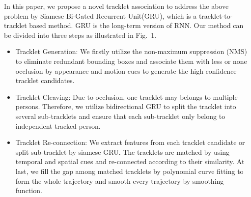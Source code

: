 \documentclass[5pt]{article}
\begin{document}
In this paper, we propose a novel tracklet association to address the above problem by Siamese Bi-Gated Recurrent Unit(GRU), which is a tracklet-to-tracklet based method. GRU is the long-term version of RNN. Our method can be divided into three steps as illustrated in Fig.\ 1.

\begin{itemize}
  \item Tracklet Generation: We firstly utilize the non-maximum suppression (NMS) to eliminate redundant bounding boxes and associate them with less or none occlusion by appearance and motion cues to generate the high confidence tracklet candidates.
      \vspace{-0.1cm}
  \item Tracklet Cleaving: Due to occlusion, one tracklet may belongs to multiple persons. Therefore, we utilize bidirectional GRU to split the tracklet into several sub-tracklets and ensure that each sub-tracklet only belong to independent tracked person.
      \vspace{-0.1cm}
  \item Tracklet Re-connection: We extract features from each tracklet candidate or split sub-tracklet by siamese GRU. The tracklets are matched by using temporal and spatial cues and re-connected according to their similarity. At last, we fill the gap among matched tracklets by polynomial curve fitting to form the whole trajectory and smooth every trajectory by smoothing function.
\end{itemize}

\vspace{-0.4cm}
\end{document}
